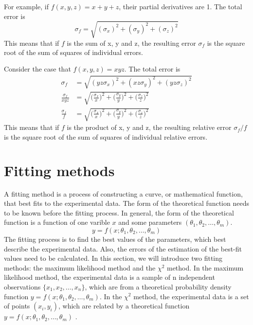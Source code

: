 \documentclass[12pt,a4paper]{report}
\begin{document}
For example, if $f(x,y,z) = x+y+z$, their partial derivatives are 1. The total error is
\begin{equation}
\sigma_{f} = \sqrt{( \sigma_x )^2 + ( \sigma_y )^2+ ( \sigma_z )^2}
\end{equation}
 This means that if $f$ is the sum of x, y and z, the resulting error $\sigma_{f}$ is the square root of the sum of squares of individual errors.
 
Consider the case that $f(x,y,z) = xyz$. The total error is
\begin{align}
\sigma_{f} &= \sqrt{( yz \sigma_x )^2 + ( xz \sigma_y )^2+ ( yz \sigma_z )^2} \\
\frac{ \sigma_{f} }{xyz} &= \sqrt{ \Big( \frac{\sigma_x}{x} \Big)^2 + \Big( \frac{\sigma_y}{y} \Big)^2 + \Big( \frac{\sigma_z}{z} \Big)^2} \\
\frac{ \sigma_{f} }{f} &= \sqrt{ \Big( \frac{\sigma_x}{x} \Big)^2 + \Big( \frac{\sigma_y}{y} \Big)^2 + \Big( \frac{\sigma_z}{z} \Big)^2}
\end{align}
This means that if $f$ is the product of x, y and z, the resulting relative error $\sigma_{f}/f$ is the square root of the sum of squares of individual relative errors.

\section{Fitting methods}
A fitting method is a process of constructing a curve, or mathematical function, that best fits to the experimental data.
The form of the theoretical function needs to be known before the fitting process.
In general, the form of the theoretical function is a function of one varible $x$ and some parameters $(\theta_1,\theta_2,\dots,\theta_m)$.
\begin{equation}
y = f(x;\theta_1,\theta_2,\dots,\theta_m)
\end{equation}
The fitting process is to find the best values of the parameters, which best describe the experimental data.
Also, the errors of the estimation of the best-fit values need to be calculated.
In this section, we will introduce two fitting methods: the maximum likelihood method and the $\chi^2$ method.
In the maximum likelihood method, the experimental data is a sample of n independent observations $\{ x_1, x_2, \dots , x_n \}$, which are from a theoretical probability density function $y = f(x;\theta_1,\theta_2,\dots,\theta_m)$.
In the $\chi^2$ method, the experimental data is a set of points $(x_i,y_i)$, which are related by a theoretical function $y = f(x;\theta_1,\theta_2,\dots,\theta_m)$ .
\end{document}
